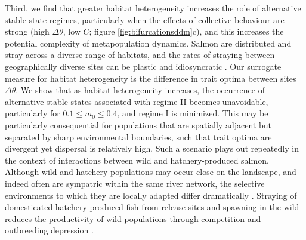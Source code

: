 \documentclass{revtex4}
\begin{document}
% 
% 


Third, we find that greater habitat heterogeneity increases the role of alternative stable state regimes, particularly when the effects of collective behaviour are strong (high $\Delta\theta$, low $C$; figure \ref{fig:bifurcationsddm}c), and this increases the potential complexity of metapopulation dynamics.
Salmon are distributed and stray across a diverse range of habitats, and the rates of straying between geographically diverse sites can be plastic and idiosyncratic \citep{Westley:2015to}.
Our surrogate measure for habitat heterogeneity is the difference in trait optima between sites $\Delta\theta$.
We show that as habitat heterogeneity increases, the occurrence of alternative stable states associated with regime II becomes unavoidable, particularly for $0.1 \leq m_0 \leq 0.4$, and regime I is minimized.
This may be particularly consequential for populations that are spatially adjacent but separated by sharp environmental boundaries, such that trait optima are divergent yet dispersal is relatively high.
Such a scenario plays out repeatedly in the context of interactions between wild and hatchery-produced salmon. 
Although wild and hatchery populations may occur close on the landscape, and indeed often are sympatric within the same river network, the selective environments to which they are locally adapted differ dramatically \citep{Christie:2012bj}. 
Straying of domesticated hatchery-produced fish from release sites and spawning in the wild reduces the productivity of wild populations through competition and outbreeding depression \citep{Chilcote:2003bb,Araki:2007cm}.
\end{document}
